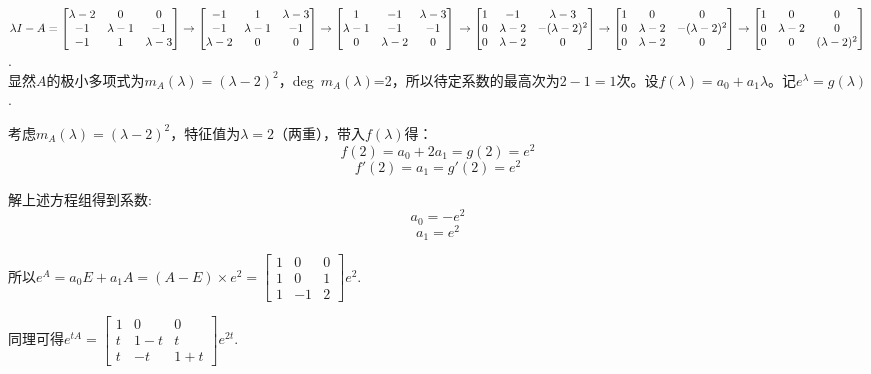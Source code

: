 \documentclass[11pt, a4paper]{article}
\begin{document}
$\lambda I-A = \begin{bmatrix} \lambda-2 & 0 & 0 \\ -1 & \lambda-1 & -1 \\ -1 & 1 & \lambda-3 \end{bmatrix}
\rightarrow
\begin{bmatrix} -1 & 1 & \lambda-3\\-1 & \lambda-1 & -1  \\ \lambda-2 & 0 & 0  \end{bmatrix}
\rightarrow
\begin{bmatrix} 1 & -1 & \lambda-3\\\lambda-1 & -1 & -1  \\  0&\lambda-2  & 0  \end{bmatrix}\\
\rightarrow
\begin{bmatrix} 1 & -1 & \lambda-3\\0 & \lambda-2 & -(\lambda-2)^2   \\  0&\lambda-2  & 0  \end{bmatrix}
\rightarrow
\begin{bmatrix} 1 & 0 & 0\\0 & \lambda-2 & -(\lambda-2)^2   \\  0&\lambda-2  & 0  \end{bmatrix}
\rightarrow
\begin{bmatrix} 1 & 0 & 0\\0 & \lambda-2 & 0 \\  0&0  & (\lambda-2)^2  \end{bmatrix}$.\\

显然$A$的极小多项式为$m_A(\lambda)=(\lambda-2)^2 $，deg\ $m_A(\lambda)$=2，所以待定系数的最高次为$2-1=1$次。设$f(\lambda) = a_0+a_1\lambda $。记$e^{\lambda} = g(\lambda)$.

考虑$m_A(\lambda) = (\lambda-2)^2 $，特征值为$\lambda = 2$（两重），带入$f(\lambda)$得：
$$f(2)=a_0+2a_1=g(2)=e^2$$
$$f'(2)=a_1=g'(2)=e^2$$

解上述方程组得到系数:
$$a_0= -e^2$$
$$a_1= e^2$$

所以$e^A=a_0E+a_1A=(A-E)\times e^2=\begin{bmatrix} 1 & 0 & 0\\1 & 0 & 1 \\  1&-1  & 2  \end{bmatrix}e^2$.

同理可得$e^{tA}=\begin{bmatrix} 1 & 0 & 0\\t & 1-t & t \\  t&-t  & 1+t \end{bmatrix}e^{2t}$.
\end{document}
